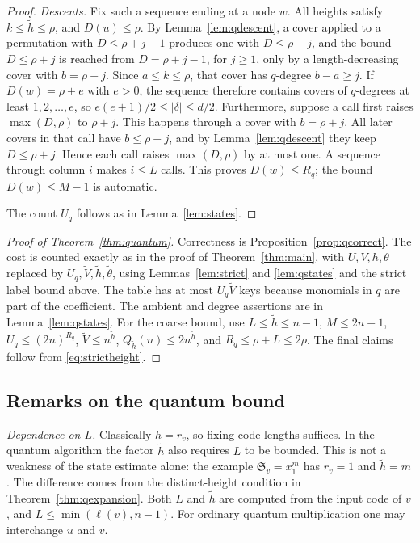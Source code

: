 \documentclass{amsart}
\theoremstyle{definition}
\theoremstyle{remark}
\numberwithin{equation}{section}
\newcommand{\Sch}{\mathfrak S}
\begin{document}
\begin{proof}
\emph{Descents.}
Fix such a sequence ending at a node $w$.
All heights satisfy $k\leq\tilde h\leq\rho$, and $D(u)\leq\rho$.
By Lemma~\ref{lem:qdescent}, a cover applied to a permutation with
$D\leq\rho+j-1$ produces one with $D\leq\rho+j$, and the bound
$D\leq\rho+j$ is reached from $D=\rho+j-1$, for $j\geq1$, only by a
length-decreasing cover with $b=\rho+j$.
Since $a\leq k\leq\rho$, that cover has $q$-degree $b-a\geq j$.
If $D(w)=\rho+e$ with $e>0$, the sequence therefore contains covers
of $q$-degrees at least $1,2,\ldots,e$, so $e(e+1)/2\leq|\delta|\leq d/2$.
Furthermore, suppose a call first raises $\max(D,\rho)$ to $\rho+j$.
This happens through a cover with $b=\rho+j$.
All later covers in that call have $b\leq\rho+j$, and by
Lemma~\ref{lem:qdescent} they keep $D\leq\rho+j$.
Hence each call raises $\max(D,\rho)$ by at most one.
A sequence through column $i$ makes $i\leq L$ calls.
This proves $D(w)\leq R_q$; the bound $D(w)\leq M-1$ is automatic.

The count $U_q$ follows as in Lemma~\ref{lem:states}.
\end{proof}

\begin{proof}[Proof of Theorem~\ref{thm:quantum}]
Correctness is Proposition~\ref{prop:qcorrect}.
The cost is counted exactly as in the proof of Theorem~\ref{thm:main},
with $U,V,h,\theta$ replaced by $U_q,\widetilde V,\tilde h,\tilde\theta$,
using Lemmas~\ref{lem:strict} and \ref{lem:qstates} and the strict
label bound above.
The table has at most $U_q\widetilde V$ keys because
monomials in $q$ are part of the coefficient.
The ambient and degree assertions are in Lemma~\ref{lem:qstates}.
For the coarse bound, use $L\leq\tilde h\leq n-1$, $M\leq2n-1$,
$U_q\leq(2n)^{R_q}$, $\widetilde V\leq n^{\tilde h}$,
$Q_{\tilde h}(n)\leq2n^{\tilde h}$, and $R_q\leq\rho+L\leq2\rho$.
The final claims follow from \eqref{eq:strictheight}.
\end{proof}

\subsection{Remarks on the quantum bound}

\emph{Dependence on $L$.}
Classically $h=r_v$, so fixing code lengths suffices.
In the quantum algorithm the factor $\tilde h$ also requires $L$ to be
bounded.
This is not a weakness of the state estimate alone: the example
$\Sch_v=x_1^m$ has $r_v=1$ and $\tilde h=m$.
The difference comes from the distinct-height condition in
Theorem~\ref{thm:qexpansion}.
Both $L$ and $\tilde h$ are computed from the input code of $v$, and
$L\leq\min(\ell(v),n-1)$.
For ordinary quantum multiplication one may interchange $u$ and $v$.
\end{document}
